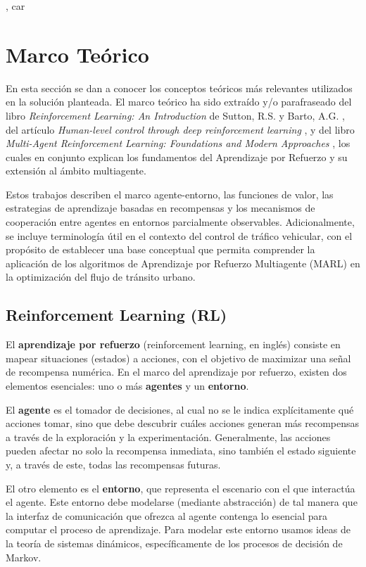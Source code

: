 , car\chapter{Marco Teórico}
\label{capitulo 1}

En esta sección se dan a conocer los conceptos teóricos más relevantes utilizados en la solución planteada. El marco teórico ha sido extraído y/o parafraseado del libro \textit{Reinforcement Learning: An Introduction} de Sutton, R.S. y Barto, A.G. \cite{suttonRL}, del artículo \textit{Human-level control through deep reinforcement learning} \cite{mnih2015}, y del libro \textit{Multi-Agent Reinforcement Learning: Foundations and Modern Approaches} \cite{marlbook}, los cuales en conjunto explican los fundamentos del Aprendizaje por Refuerzo y su extensión al ámbito multiagente. 

Estos trabajos describen el marco agente-entorno, las funciones de valor, las estrategias de aprendizaje basadas en recompensas y los mecanismos de cooperación entre agentes en entornos parcialmente observables. Adicionalmente, se incluye terminología útil en el contexto del control de tráfico vehicular, con el propósito de establecer una base conceptual que permita comprender la aplicación de los algoritmos de Aprendizaje por Refuerzo Multiagente (MARL) en la optimización del flujo de tránsito urbano.



\section{Reinforcement Learning (RL)}
El \textbf{aprendizaje por refuerzo} (reinforcement learning, en inglés) consiste en mapear situaciones (estados) a acciones, con el objetivo de maximizar una señal de recompensa numérica. En el marco del aprendizaje por refuerzo, existen dos elementos esenciales: uno o más \textbf{agentes} y un \textbf{entorno}.

El \textbf{agente} es el tomador de decisiones, al cual no se le indica explícitamente qué acciones tomar, sino que debe descubrir cuáles acciones generan más recompensas a través de la exploración y la experimentación. Generalmente, las acciones pueden afectar no solo la recompensa inmediata, sino también el estado siguiente y, a través de este, todas las recompensas futuras.

El otro elemento es el \textbf{entorno}, que representa el escenario con el que interactúa el agente. Este entorno debe modelarse (mediante abstracción) de tal manera que la interfaz de comunicación que ofrezca al agente contenga lo esencial para computar el proceso de aprendizaje. Para modelar este entorno usamos ideas de la teoría de sistemas dinámicos, específicamente de los procesos de decisión de Markov.


